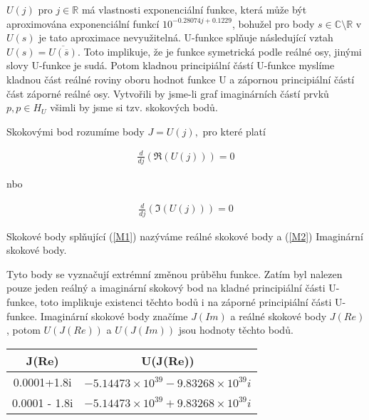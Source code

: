 \(U(j)\) pro \(j \in \mathbb{R} \) má vlastnosti 
exponenciální funkce, která může být aproximována 
exponenciální funkcí \(10^{-0.28074j + 0.1229}\), 
bohužel pro body \(s \in \mathbb{C} \setminus 
\mathbb{R}\) v \(U(s)\) je tato aproximace 
nevyužitelná. U-funkce splňuje následující vztah
\(U(s) = \overline{U(\overline{s})}\). Toto implikuje,
že je funkce symetrická podle reálné osy, jinými slovy
U-funkce je sudá. Potom kladnou principiální částí
U-funkce myslíme kladnou část reálné roviny oboru 
hodnot funkce U a zápornou principiální částí část
záporné reálné osy. Vytvořili by jsme-li graf 
imaginárních částí prvků \(p, p \in H_U\) všimli
by jsme si tzv. skokových bodů.

\begin{definition}
      Skokovými bod rozumíme body \(J = U(j),\) pro které platí
      
      \begin{align}
            \frac{d}{dj}\left(\Re(U(j))\right) =0  
      \label{M1}
      \end{align}

      nbo
      
      \begin{align}
             \frac{d}{dj}\left(\Im(U(j))\right) = 0
      \label{M2}
      \end{align}
      
      Skokové body splňující (\ref{M1}) nazýváme reálné 
      skokové body a (\ref{M2}) Imaginární skokové body.
      
\end{definition}

Tyto body se vyznačují extrémní změnou průběhu funkce. 
Zatím byl nalezen pouze jeden reálný a imaginární skokový
bod na kladné principiální části U-funkce, toto implikuje 
existenci těchto bodů i na záporné principiální části 
U-funkce. Imaginární skokové body značíme \(J(Im)\) a 
reálné skokové body \(J(Re)\), potom \(U(J(Re))\) a 
\(U(J(Im))\) jsou hodnoty těchto bodů.

\begin{table}[h!]
      \centering
      \begin{tabular}{||c c||} 
            \hline
            J(Re) & U(J(Re)) \\ [0.5ex] 
            \hline\hline
            0.0001+1.8i & \(-5.14473 \times 10^{39} -9.83268 \times 10^{39} i\)  \\
            0.0001 - 1.8i & \(-5.14473 \times 10^{39} +9.83268 \times 10^{39} i\) \\ [1ex] 
            \hline
      \end{tabular}
\end{table}

